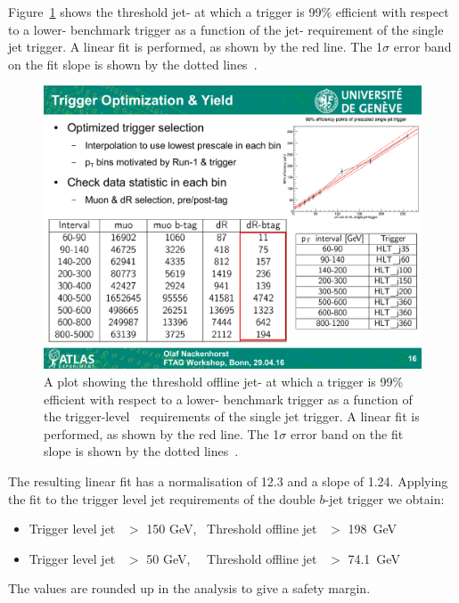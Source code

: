 Figure~\ref{fig:triggerTurnOn_fit} shows the threshold jet-\pT{} 
at which a trigger is 99\% efficient with respect to a lower-\pT{} benchmark trigger
as a function of the jet-\pT{} requirement of the single jet trigger.
A linear fit is performed, as shown by the red line.
The 1$\sigma$ error band on the fit slope is shown by the dotted lines~\cite{evt-jet_turnOnFit}.

\begin{figure}[!hbt]
    \begin{center}
        \includegraphics[width=0.7\linewidth, angle=0]{figs/Dibjet/LowMass/jetTriggerTurnOn.pdf}
      \end{center}
  \caption[A plot showing the threshold jet-\pT{} of a single jet trigger as a function of the trigger-level jet-\pT{} requirements.]
           {A plot showing the threshold offline jet-\pT{} at which a trigger is 99\% efficient
             with respect to a lower-\pT{} benchmark trigger as a function of the trigger-level~\pT{} requirements of the single jet trigger.
             A linear fit is performed, as shown by the red line. The 1$\sigma$ error band on the fit slope is shown by the dotted lines~\cite{evt-jet_turnOnFit}.}
          \label{fig:triggerTurnOn_fit}
\end{figure}

\noindent
The resulting linear fit has a normalisation of 12.3 and a slope of 1.24.
Applying the fit to the trigger level jet requirements of the double $b$-jet trigger we obtain:
\vspace{-0.5em}
\begin{itemize}[leftmargin=*]
\item Trigger level jet~\pT{} $>$ 150 GeV,~  Threshold offline jet~\pT{} $>$ 198~GeV 
\item Trigger level jet~\pT{} $>$  50 GeV,~~ Threshold offline jet~\pT{} $>$ 74.1~GeV
\end{itemize}
\vspace{-0.3em}
\noindent
The values are rounded up in the analysis to give a safety margin.

